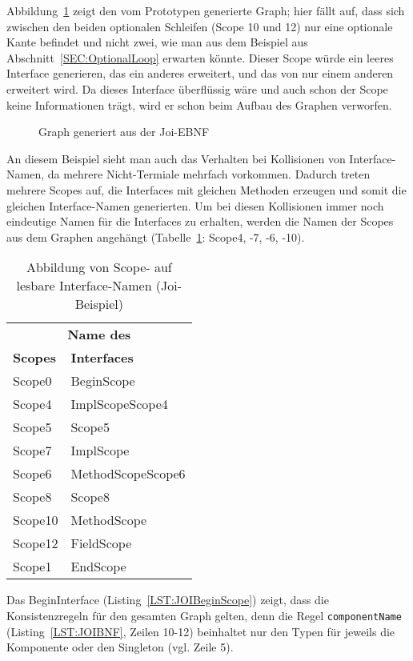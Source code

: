 \documentclass[../InterneDSLs.tex]{subfiles}
\begin{document}
Abbildung~\ref{FIG:JoiGraph} zeigt den vom Prototypen generierte Graph; hier fällt auf, dass sich zwischen den beiden optionalen Schleifen (Scope 10 und 12) nur eine optionale Kante befindet und nicht zwei, wie man aus dem Beispiel aus Abschnitt~\ref{SEC:OptionalLoop} erwarten könnte. Dieser Scope würde ein leeres Interface generieren, das ein anderes erweitert, und das von nur einem anderen erweitert wird. Da dieses Interface überflüssig wäre und auch schon der Scope keine Informationen trägt, wird er schon beim Aufbau des Graphen verworfen.
\begin{figure}[ht]
\centering
\resizebox{0.5\linewidth}{!}{}
\caption{Graph generiert aus der Joi-EBNF}
\label{FIG:JoiGraph}
\end{figure}

An diesem Beispiel sieht man auch das Verhalten bei Kollisionen von Interface-Namen, da mehrere Nicht-Termiale mehrfach vorkommen. Dadurch treten mehrere Scopes auf, die Interfaces mit gleichen Methoden erzeugen und somit die gleichen Interface-Namen generierten. Um bei diesen Kollisionen immer noch eindeutige Namen für die Interfaces zu erhalten, werden die Namen der Scopes aus dem Graphen angehängt (Tabelle~\ref{TAB:MappingJoiScopeToInterface}: Scope4, -7, -6, -10).
\begin{table}[ht]
\centering
\begin{tabular}{ll}
\multicolumn{2}{c}{\textbf{Name des}}\\
\textbf{Scopes} & \textbf{Interfaces}\\\hline
Scope0  & BeginScope\\
Scope4  & ImplScopeScope4\\
Scope5  & Scope5\\
Scope7  & ImplScope\\
Scope6  & MethodScopeScope6\\
Scope8  & Scope8\\
Scope10 & MethodScope\\
Scope12 & FieldScope\\
Scope1  & EndScope\\
\end{tabular}
\caption[Abbildung von Scope- auf Interfacenamen (Joi-Beispiel)]{Abbildung von Scope- auf lesbare Interface-Namen (Joi-Beispiel)}
\label{TAB:MappingJoiScopeToInterface}
\end{table}

Das BeginInterface (Listing~\ref{LST:JOIBeginScope}) zeigt, dass die Konsistenzregeln für den gesamten Graph gelten, denn die Regel \verb|componentName| (Listing~\ref{LST:JOIBNF}, Zeilen 10-12) beinhaltet nur den Typen für jeweils die Komponente oder den Singleton (vgl. Zeile 5).
\begin{figure}[ht]
    
\end{figure}
\end{document}
